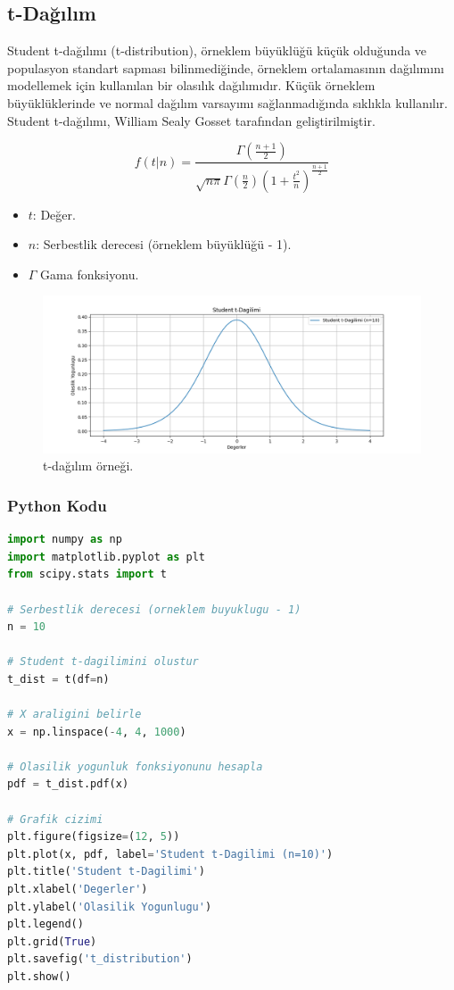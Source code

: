 \newpage

\subsection{t-Dağılım}
Student t-dağılımı (t-distribution), örneklem büyüklüğü küçük olduğunda ve populasyon standart sapması bilinmediğinde, örneklem ortalamasının dağılımını modellemek için kullanılan bir olasılık dağılımıdır. Küçük örneklem büyüklüklerinde ve normal dağılım varsayımı sağlanmadığında sıklıkla kullanılır. Student t-dağılımı, William Sealy Gosset tarafından geliştirilmiştir.

\[f(t|n) = \frac{\Gamma\left(\frac{n+1}{2}\right)}{\sqrt{n\pi}\Gamma\left(\frac{n}{2}\right)\left(1+\frac{t^2}{n}\right)^{\frac{n+1}{2}}}\]
\begin{itemize}
	\item $t$: Değer.
	\item $n$: Serbestlik derecesi (örneklem büyüklüğü - 1).
	\item $\Gamma$ Gama fonksiyonu.
\end{itemize}

\begin{figure}[h]
    \centering
    \includegraphics[width=1\textwidth]{images/t_distribution.png}
    \caption{t-dağılım örneği.}
    \label{fig:enter-label}
\end{figure}

\subsubsection{Python Kodu}

\begin{lstlisting}[language=Python]
import numpy as np
import matplotlib.pyplot as plt
from scipy.stats import t

# Serbestlik derecesi (orneklem buyuklugu - 1)
n = 10

# Student t-dagilimini olustur
t_dist = t(df=n)

# X araligini belirle
x = np.linspace(-4, 4, 1000)

# Olasilik yogunluk fonksiyonunu hesapla
pdf = t_dist.pdf(x)

# Grafik cizimi
plt.figure(figsize=(12, 5))
plt.plot(x, pdf, label='Student t-Dagilimi (n=10)')
plt.title('Student t-Dagilimi')
plt.xlabel('Degerler')
plt.ylabel('Olasilik Yogunlugu')
plt.legend()
plt.grid(True)
plt.savefig('t_distribution')
plt.show()
\end{lstlisting}

